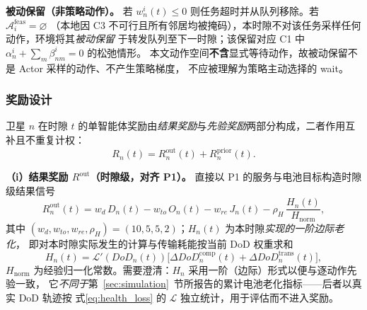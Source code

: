 \documentclass[a4paper,11pt]{article}
\begin{document}
\noindent\textbf{被动保留（非策略动作）。}
若 $w^i_n(t)\le0$ 则任务超时并从队列移除。若 $\mathcal{A}^{\mathrm{feas}}_i=\varnothing$
（本地因 C3 不可行且所有邻居均被掩码），本时隙不对该任务采样任何动作，环境将其\emph{被动保留}
于转发队列至下一时隙；该保留对应 C1 中 $\alpha^i_n+\sum_m\beta^i_{nm}=0$ 的松弛情形。
本文动作空间\textbf{不含}显式等待动作，故被动保留不是 Actor 采样的动作、不产生策略梯度，
不应被理解为策略主动选择的 wait。

\subsubsection{奖励设计}
\label{subsec:reward}

卫星 $n$ 在时隙 $t$ 的单智能体奖励由\emph{结果奖励}与\emph{先验奖励}两部分构成，二者作用互补且不重复计权：
\begin{equation}
R_n(t) = R^{\mathrm{out}}_n(t) + R^{\mathrm{prior}}_n(t).
\label{eq:reward_total}
\end{equation}

\noindent\textbf{（i）结果奖励 $R^{\mathrm{out}}$（时隙级，对齐 P1）。}
直接以 P1 的服务与电池目标构造时隙级结果信号
\begin{equation}
R^{\mathrm{out}}_n(t) = w_d\, D_n(t) - w_{to}\, O_n(t) - w_{re}\, J_n(t)
- \rho_H\, \frac{H_n(t)}{H_{\mathrm{norm}}},
\label{eq:reward_obj}
\end{equation}
其中 $(w_d,w_{to},w_{re},\rho_H)=(10,5,5,2)$；$H_n(t)$ 为本时隙\emph{实现的一阶边际老化}，
即对本时隙实际发生的计算与传输耗能按当前 DoD 权重求和
\begin{equation}
H_n(t) = \mathcal{L}'(DoD_n(t))\Big[\Delta DoD^{\mathrm{comp}}_n(t)+\Delta DoD^{\mathrm{trans}}_n(t)\Big],
\label{eq:H_slot}
\end{equation}
$H_{\mathrm{norm}}$ 为经验归一化常数。需要澄清：$H_n$ 采用一阶（边际）形式以便与逐动作先验一致，
它\emph{不同于}第~\ref{sec:simulation}~节所报告的累计电池老化指标——后者以真实 DoD 轨迹按
式\eqref{eq:health_loss} 的 $\mathcal{L}$ 独立统计，用于评估而不进入奖励。
\end{document}
